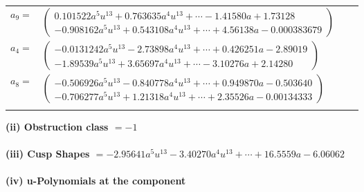 \documentclass[1p]{elsarticle_modified}
\theoremstyle{definition}
\begin{document}
\begin{tabular}{m{7pt} m{180pt} m{7pt} m{180pt} }
\flushright $a_{9}=$&$\begin{pmatrix}0.101522 a^{5} u^{13}+0.763635 a^{4} u^{13}+\cdots-1.41580 a+1.73128\\-0.908162 a^{5} u^{13}+0.543108 a^{4} u^{13}+\cdots+4.56138 a-0.000383679\end{pmatrix}$ \\
\flushright $a_{4}=$&$\begin{pmatrix}-0.0131242 a^{5} u^{13}-2.73898 a^{4} u^{13}+\cdots+0.426251 a-2.89019\\-1.89539 a^{5} u^{13}+3.65697 a^{4} u^{13}+\cdots-3.10276 a+2.14280\end{pmatrix}$ \\
\flushright $a_{8}=$&$\begin{pmatrix}-0.506926 a^{5} u^{13}-0.840778 a^{4} u^{13}+\cdots+0.949870 a-0.503640\\-0.706277 a^{5} u^{13}+1.21318 a^{4} u^{13}+\cdots+2.35526 a-0.00134333\end{pmatrix}$\\&\end{tabular}
\flushleft \textbf{(ii) Obstruction class $= -1$}\\~\\
\flushleft \textbf{(iii) Cusp Shapes $= -2.95641 a^{5} u^{13}-3.40270 a^{4} u^{13}+\cdots+16.5559 a-6.06062$}\\~\\
\newpage\renewcommand{\arraystretch}{1}
\flushleft \textbf{(iv) u-Polynomials at the component}\newline \\
\end{document}
